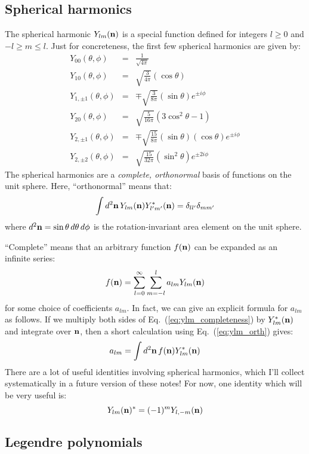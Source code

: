 \documentclass[aps,prd,superscriptaddress,groupedaddress,nofootinbib,nobibnotes]{revtex4}
\newcommand{\be}{\begin{equation}}
\newcommand{\ee}{\end{equation}}
\newcommand{\ba}{\begin{eqnarray}}
\newcommand{\ea}{\end{eqnarray}}
\newcommand{\nn}{\nonumber}
\def\n{{\bf n}}
\begin{document}
\subsection{Spherical harmonics}

The spherical harmonic $Y_{lm}(\n)$ is a special function defined for integers $l \ge 0$
and $-l \ge m \le l$.  Just for concreteness, the first few spherical harmonics are given by:
\ba
Y_{00}(\theta,\phi) &=& \frac{1}{\sqrt{4\pi}} \nn \\
Y_{10}(\theta,\phi) &=& \sqrt{\frac{3}{4\pi}} (\cos\theta) \nn \\
Y_{1,\pm 1}(\theta,\phi) &=& \mp \sqrt{\frac{3}{8\pi}} (\sin\theta) e^{\pm i\phi} \nn \\
Y_{20}(\theta,\phi) &=& \sqrt{\frac{5}{16\pi}} (3 \cos^2\theta - 1) \nn  \\
Y_{2,\pm 1}(\theta,\phi) &=& \mp \sqrt{\frac{15}{8\pi}} (\sin\theta) (\cos\theta) e^{\pm i \phi} \nn \\
Y_{2,\pm 2}(\theta,\phi) &=& \sqrt{\frac{15}{32\pi}} (\sin^2\theta) e^{\pm 2 i \phi}
\ea
The spherical harmonics are a {\em complete, orthonormal} basis of functions on the unit sphere.
Here, ``orthonormal'' means that:
\be
\int d^2\n \, Y_{lm}(\n) Y_{l'm'}^*(\n) = \delta_{ll'} \delta_{mm'}  \label{eq:ylm_orth}
\ee
where $d^2\n = \sin\theta \, d\theta \, d\phi$ is the rotation-invariant area element on the unit sphere.

``Complete'' means that an arbitrary function $f(\n)$ can be expanded as an infinite series:
\be
f(\n) = \sum_{l=0}^\infty \sum_{m=-l}^l a_{lm} Y_{lm}(\n)  \label{eq:ylm_completeness}
\ee
for some choice of coefficients $a_{lm}$.  In fact, we can give an explicit formula for $a_{lm}$ as follows.  
If we multiply both sides of Eq.~(\ref{eq:ylm_completeness})
by $Y_{lm}^*(\n)$ and integrate over $\n$, then a short calculation using Eq.~(\ref{eq:ylm_orth}) gives:
\be
a_{lm} = \int d^2\n \, f(\n) Y_{lm}^*(\n)
\ee
There are a lot of useful identities involving spherical harmonics, which I'll collect systematically
in a future version of these notes!  For now, one identity which will be very useful is:
\be
Y_{lm}(\n)^* = (-1)^m Y_{l,-m}(\n)
\ee

\subsection{Legendre polynomials}
\end{document}
